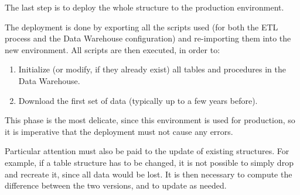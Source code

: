 The last step is to deploy the whole structure to the production environment.

The deployment is done by exporting all the scripts used (for both the ETL process and the Data Warehouse configuration) and re-importing them into the new environment.
All scripts are then executed, in order to:
\begin{enumerate}
    \item Initialize (or modify, if they already exist) all tables and procedures in the Data Warehouse.
    
    \item Download the first set of data (typically up to a few years before).
\end{enumerate}

This phase is the most delicate, since this environment is used for production, so it is imperative that the deployment must not cause any errors.

Particular attention must also be paid to the update of existing structures.
For example, if a table structure has to be changed, it is not possible to simply drop and recreate it, since all data would be lost.
It is then necessary to compute the difference between the two versions, and to update as needed.
